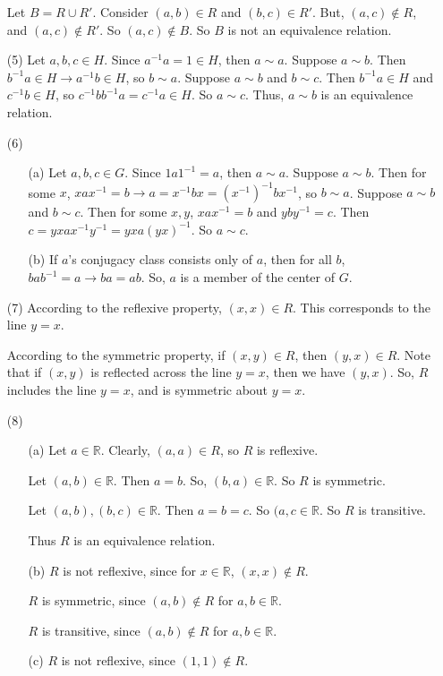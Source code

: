\begin{itemize}
Let $B = R \cup R'$. Consider $(a, b) \in R$ and $(b, c) \in R'$. But, $(a, c) \not \in R$, and $(a, c) \not \in R'$. So $(a, c) \not \in B$. So $B$ is not an equivalence relation.
\item[(5)]
Let $a, b, c \in H$. Since $a^{-1}a = 1 \in H$, then $a \sim a$. Suppose $a \sim b$. Then $b^{-1}a \in H \rightarrow a^{-1}b \in H$, so $b \sim a$. Suppose $a \sim b$ and $b \sim c$. Then $b^{-1}a \in H$ and $c^{-1}b \in H$, so $c^{-1}bb^{-1}a = c^{-1}a \in H$. So $a \sim c$. Thus, $a \sim b$ is an equivalence relation.
\item[(6)]
\begin{itemize}
\item[(a)]
Let $a, b, c \in G$. Since $1a1^{-1} = a$, then $a \sim a$. Suppose $a \sim b$. Then for some $x$, $xax^{-1} = b \rightarrow a = x^{-1}bx = (x^{-1})^{-1}bx^{-1}$, so $b \sim a$. Suppose $a \sim b$ and $b \sim c$. Then for some $x, y$, $xax^{-1} = b$ and $yby^{-1} = c$. Then $c = yxax^{-1}y^{-1} = yxa(yx)^{-1}$. So $a \sim c$. 
\item[(b)]
If $a$'s conjugacy class consists only of $a$, then for all $b$, $bab^{-1} = a \rightarrow ba = ab$. So, $a$ is a member of the center of $G$.
\end{itemize}
\item[(7)]
According to the reflexive property, $(x, x) \in R$. This corresponds to the line $y = x$.

According to the symmetric property, if $(x, y) \in R$, then $(y, x) \in R$. Note that if $(x, y)$ is reflected across the line $y = x$, then we have $(y, x)$. So, $R$ includes the line $y = x$, and is symmetric about $y = x$.
\item[(8)]
\begin{itemize}
\item[(a)]
Let $a \in \mathbb{R}$. Clearly, $(a, a) \in R$, so $R$ is reflexive. 

Let $(a, b) \in \mathbb{R}$. Then $a = b$. So, $(b, a) \in \mathbb{R}$. So $R$ is symmetric. 

Let $(a, b), (b, c) \in \mathbb{R}$. Then $a = b = c$. So $(a, c \in \mathbb{R}$. So $R$ is transitive. 

Thus $R$ is an equivalence relation.
\item[(b)]
$R$ is not reflexive, since for $x \in \mathbb{R}$, $(x, x) \not \in R$.

$R$ is symmetric, since $(a, b) \not \in R$ for $a, b \in \mathbb{R}$.

$R$ is transitive, since $(a, b) \not \in R$ for $a, b \in \mathbb{R}$.
\item[(c)]
$R$ is not reflexive, since $(1, 1) \not \in R$.


\end{itemize}
\end{itemize}
